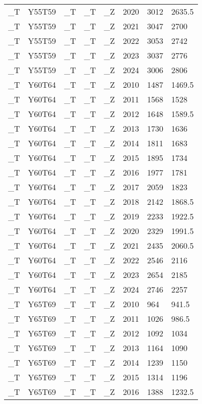 \begin{longtable}[t]{llllllll}
\addlinespace
\_T & Y55T59 & \_T & \_T & \_Z & 2020 & 3012 & 2635.5\\
\_T & Y55T59 & \_T & \_T & \_Z & 2021 & 3047 & 2700\\
\_T & Y55T59 & \_T & \_T & \_Z & 2022 & 3053 & 2742\\
\_T & Y55T59 & \_T & \_T & \_Z & 2023 & 3037 & 2776\\
\_T & Y55T59 & \_T & \_T & \_Z & 2024 & 3006 & 2806\\
\addlinespace
\_T & Y60T64 & \_T & \_T & \_Z & 2010 & 1487 & 1469.5\\
\_T & Y60T64 & \_T & \_T & \_Z & 2011 & 1568 & 1528\\
\_T & Y60T64 & \_T & \_T & \_Z & 2012 & 1648 & 1589.5\\
\_T & Y60T64 & \_T & \_T & \_Z & 2013 & 1730 & 1636\\
\_T & Y60T64 & \_T & \_T & \_Z & 2014 & 1811 & 1683\\
\addlinespace
\_T & Y60T64 & \_T & \_T & \_Z & 2015 & 1895 & 1734\\
\_T & Y60T64 & \_T & \_T & \_Z & 2016 & 1977 & 1781\\
\_T & Y60T64 & \_T & \_T & \_Z & 2017 & 2059 & 1823\\
\_T & Y60T64 & \_T & \_T & \_Z & 2018 & 2142 & 1868.5\\
\_T & Y60T64 & \_T & \_T & \_Z & 2019 & 2233 & 1922.5\\
\addlinespace
\_T & Y60T64 & \_T & \_T & \_Z & 2020 & 2329 & 1991.5\\
\_T & Y60T64 & \_T & \_T & \_Z & 2021 & 2435 & 2060.5\\
\_T & Y60T64 & \_T & \_T & \_Z & 2022 & 2546 & 2116\\
\_T & Y60T64 & \_T & \_T & \_Z & 2023 & 2654 & 2185\\
\_T & Y60T64 & \_T & \_T & \_Z & 2024 & 2746 & 2257\\
\addlinespace
\_T & Y65T69 & \_T & \_T & \_Z & 2010 & 964 & 941.5\\
\_T & Y65T69 & \_T & \_T & \_Z & 2011 & 1026 & 986.5\\
\_T & Y65T69 & \_T & \_T & \_Z & 2012 & 1092 & 1034\\
\_T & Y65T69 & \_T & \_T & \_Z & 2013 & 1164 & 1090\\
\_T & Y65T69 & \_T & \_T & \_Z & 2014 & 1239 & 1150\\
\addlinespace
\_T & Y65T69 & \_T & \_T & \_Z & 2015 & 1314 & 1196\\
\_T & Y65T69 & \_T & \_T & \_Z & 2016 & 1388 & 1232.5\\

\end{longtable}
